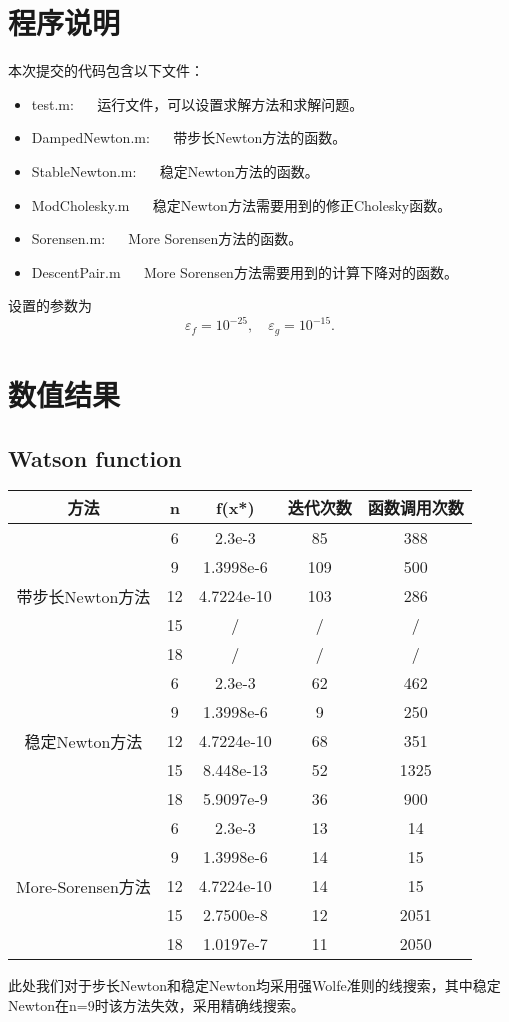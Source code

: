 \documentclass[a4paper,  11pt]{ctexart}
\begin{document}
\section{程序说明}
本次提交的代码包含以下文件：
\begin{itemize}
  \item test.m: ~~ 运行文件，可以设置求解方法和求解问题。
  \item DampedNewton.m: ~~ 带步长Newton方法的函数。
  \item StableNewton.m: ~~ 稳定Newton方法的函数。
  \item ModCholesky.m ~~ 稳定Newton方法需要用到的修正Cholesky函数。
  \item Sorensen.m: ~~ More Sorensen方法的函数。
  \item DescentPair.m ~~ More Sorensen方法需要用到的计算下降对的函数。
\end{itemize}
设置的参数为
\[  
\varepsilon_f=10^{-25},\quad \varepsilon_g=10^{-15}.
\]
\section{数值结果}
\subsection{Watson function}
\begin{table}[H]
  \centering
  \begin{tabular}{|c|c|c|c|c|}
    \hline
  方法 &  n & f(x*) & 迭代次数 & 函数调用次数  \\
  \hline 
  \multirow{5}{*}{带步长Newton方法} & 6 & 2.3e-3 & 85 & 388 \\
  \cline{2-5}
  & 9& 1.3998e-6 & 109 & 500 \\
  \cline{2-5}
  & 12 & 4.7224e-10 & 103 & 286 \\
  \cline{2-5}
  & 15 & / & / & / \\
  \cline{2-5}
  & 18 & / & / & / \\
  \hline
  \multirow{5}{*}{稳定Newton方法} & 6 & 2.3e-3 & 62 & 462 \\
  \cline{2-5}
  & 9& 1.3998e-6 & 9 & 250 \\
  \cline{2-5}
  & 12 & 4.7224e-10 & 68 & 351 \\
  \cline{2-5}
  & 15 & 8.448e-13 & 52 & 1325 \\
  \cline{2-5}
  & 18 & 5.9097e-9 & 36 & 900 \\
  \hline
  \multirow{5}{*}{More-Sorensen方法} & 6 & 2.3e-3 & 13 & 14 \\
  \cline{2-5}
  & 9& 1.3998e-6 & 14 & 15 \\
  \cline{2-5}
  & 12 & 4.7224e-10 & 14 & 15 \\
  \cline{2-5}
  & 15 & 2.7500e-8 & 12 & 2051 \\
  \cline{2-5}
  & 18 & 1.0197e-7 & 11 & 2050 \\
  \hline
  
  \end{tabular}
\end{table}
此处我们对于步长Newton和稳定Newton均采用强Wolfe准则的线搜索，其中稳定
Newton在n=9时该方法失效，采用精确线搜索。
\end{document}
